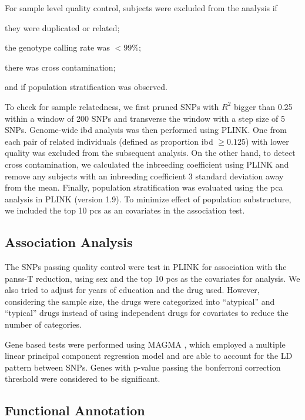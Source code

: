 	For sample level quality control, subjects were excluded from the analysis if 
	\begin{enumerate*}[label=\roman*)]
		\item they were duplicated or related;
		\item the genotype calling rate was $<99\%$;
		\item there was cross contamination;
		\item and if population stratification was observed.
	\end{enumerate*}
	
	To check for sample relatedness, we first pruned \glspl{SNP} with $R^2$ bigger than 0.25 within a window of 200 \glspl{SNP} and transverse the window with a step size of 5 \glspl{SNP}.
	Genome-wide \gls{ibd} analysis was then performed using PLINK.
	One from each pair of related individuals (defined as proportion \gls{ibd} $\ge0.125$) with lower quality was excluded from the subsequent analysis.
	On the other hand, to detect cross contamination, we calculated the inbreeding coefficient using PLINK and remove any subjects with an inbreeding coefficient 3 standard deviation away from the mean.
	Finally, population stratification was evaluated using the \gls{pca} analysis in PLINK (version 1.9).
	To minimize effect of population substructure, we included the top 10 \glspl{pc} as an covariates in the association test.
	
	\subsection{Association Analysis}
	The \glspl{SNP} passing quality control were test in PLINK for association with the \gls{panss}-T reduction, using sex and the top 10 \glspl{pc} as the covariates for analysis.
	We also tried to adjust for years of education and the drug used.
	However, considering the sample size, the drugs were categorized into ``atypical'' and ``typical'' drugs instead of using independent drugs for covariates to reduce the number of categories. 
	
	Gene based tests were performed using \gls{MAGMA} \citep{DeLeeuw2015}, which employed a multiple linear principal component regression model and are able to account for the \gls{LD} pattern between \glspl{SNP}.
	Genes with p-value passing the bonferroni correction threshold were considered to be significant.
	
	\subsection{Functional Annotation}
	
